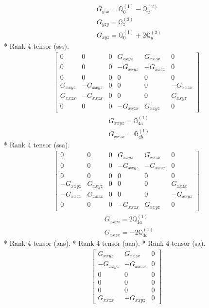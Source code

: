 \documentclass[fleqn,8pt,landscape]{jsarticle}
\begin{document}
\begin{align*}
& G_{yzx} = \mathbb{Q}_{0}^{(1)} - \mathbb{Q}_{u}^{(2)} \\
& G_{yzy} = \mathbb{G}_{z}^{(3)} \\
& G_{xyz} = \mathbb{Q}_{0}^{(1)} + 2 \mathbb{Q}_{u}^{(2)}
\end{align*}
* Rank 4 tensor (sss).
\begin{align*}
\begin{bmatrix} 0 & 0 & 0 & G_{xxyz} & G_{xxzx} & 0 \\ 0 & 0 & 0 & - G_{xxyz} & - G_{xxzx} & 0 \\ 0 & 0 & 0 & 0 & 0 & 0 \\ G_{xxyz} & - G_{xxyz} & 0 & 0 & 0 & - G_{xxzx} \\ G_{xxzx} & - G_{xxzx} & 0 & 0 & 0 & G_{xxyz} \\ 0 & 0 & 0 & - G_{xxzx} & G_{xxyz} & 0 \end{bmatrix}
\end{align*}
\begin{align*}
& G_{xxyz} = \mathbb{G}_{4a}^{(1)} \\
& G_{xxzx} = \mathbb{G}_{4b}^{(1)}
\end{align*}
* Rank 4 tensor (ssa).
\begin{align*}
\begin{bmatrix} 0 & 0 & 0 & G_{xxyz} & G_{xxzx} & 0 \\ 0 & 0 & 0 & - G_{xxyz} & - G_{xxzx} & 0 \\ 0 & 0 & 0 & 0 & 0 & 0 \\ - G_{xxyz} & G_{xxyz} & 0 & 0 & 0 & G_{xxzx} \\ - G_{xxzx} & G_{xxzx} & 0 & 0 & 0 & - G_{xxyz} \\ 0 & 0 & 0 & - G_{xxzx} & G_{xxyz} & 0 \end{bmatrix}
\end{align*}
\begin{align*}
& G_{xxyz} = 2 \mathbb{Q}_{3a}^{(1)} \\
& G_{xxzx} = - 2 \mathbb{Q}_{3b}^{(1)}
\end{align*}
* Rank 4 tensor (aas).
* Rank 4 tensor (aaa).
* Rank 4 tensor (sa).
\begin{align*}
\begin{bmatrix} G_{xxyz} & G_{xxzx} & 0 \\ - G_{xxyz} & - G_{xxzx} & 0 \\ 0 & 0 & 0 \\ 0 & 0 & 0 \\ 0 & 0 & 0 \\ G_{xxzx} & - G_{xxyz} & 0 \end{bmatrix}
\end{align*}
\end{document}
